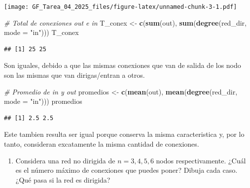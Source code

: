 \documentclass[
]{article}
\newenvironment{Shaded}{\begin{snugshade}}{\end{snugshade}}
\newcommand{\AttributeTok}[1]{\textcolor[rgb]{0.13,0.29,0.53}{#1}}
\newcommand{\CommentTok}[1]{\textcolor[rgb]{0.56,0.35,0.01}{\textit{#1}}}
\newcommand{\FunctionTok}[1]{\textcolor[rgb]{0.13,0.29,0.53}{\textbf{#1}}}
\newcommand{\NormalTok}[1]{#1}
\newcommand{\OtherTok}[1]{\textcolor[rgb]{0.56,0.35,0.01}{#1}}
\newcommand{\StringTok}[1]{\textcolor[rgb]{0.31,0.60,0.02}{#1}}
\providecommand{\tightlist}{%
  \setlength{\itemsep}{0pt}\setlength{\parskip}{0pt}}
\begin{document}
\texttt{[image: GF\_Tarea\_04\_2025\_files/figure-latex/unnamed-chunk-3-1.pdf]}

\begin{Shaded}
\begin{Highlighting}[]
\CommentTok{\# Total de conexiones out e in}
\NormalTok{T\_conex }\OtherTok{\textless{}{-}} \FunctionTok{c}\NormalTok{(}\FunctionTok{sum}\NormalTok{(out), }\FunctionTok{sum}\NormalTok{(}\FunctionTok{degree}\NormalTok{(red\_dir, }\AttributeTok{mode =} \StringTok{"in"}\NormalTok{)))}
\NormalTok{T\_conex}
\end{Highlighting}
\end{Shaded}

\begin{verbatim}
## [1] 25 25
\end{verbatim}

Son iguales, debido a que las mismas conexiones que van de salida de los
nodo son las mismas que van dirigas/entran a otros.

\begin{Shaded}
\begin{Highlighting}[]
\CommentTok{\# Promedio de in y out}
\NormalTok{promedios }\OtherTok{\textless{}{-}} \FunctionTok{c}\NormalTok{(}\FunctionTok{mean}\NormalTok{(out), }\FunctionTok{mean}\NormalTok{(}\FunctionTok{degree}\NormalTok{(red\_dir, }\AttributeTok{mode =} \StringTok{"in"}\NormalTok{)))}
\NormalTok{promedios}
\end{Highlighting}
\end{Shaded}

\begin{verbatim}
## [1] 2.5 2.5
\end{verbatim}

Este tambien resulta ser igual porque conserva la misma caracteristica
y, por lo tanto, consideran excatamente la misma cantidad de conexiones.

\begin{enumerate}
\def\labelenumi{\arabic{enumi}.}
\setcounter{enumi}{2}
\tightlist
\item
  Considera una red no dirigida de \(n=3,4,5,6\) nodos respectivamente.
  ¿Cuál es el número máximo de conexiones que puedes poner? Dibuja cada
  caso. ¿Qué pasa si la red es dirigida?
\end{enumerate}
\end{document}
